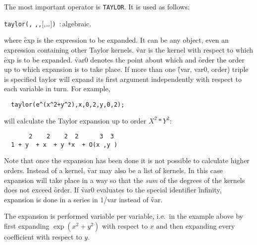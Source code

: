


The most important operator is \texttt{TAYLOR}.
It is used as follows:
\hypertarget{operator:TAYLOR}{}
\begin{syntax}
  \texttt{taylor(}\texttt{,}
         \texttt{,}\texttt{,}[,\ldots]\texttt{)}
         \,:\,algebraic.
\end{syntax}
where \f{exp} is the expression to be expanded. It can be any \REDUCE{}
object, even an expression containing other Taylor kernels. \f{var} is
the kernel with respect to which \f{exp} is to be expanded. \f{var0}
denotes the point about which and \f{order} the order up to which
expansion is to take place. If more than one \f{(var, var0, order)} triple
is specified \f{taylor} will expand its first argument independently
with respect to each variable in turn. For example,
\begin{verbatim}
  taylor(e^(x^2+y^2),x,0,2,y,0,2);
\end{verbatim}
will calculate the Taylor expansion up to order $X^{2}*Y^{2}$:
\begin{verbatim}
       2    2    2  2      3  3
  1 + y  + x  + y *x  + O(x ,y )
\end{verbatim}
Note that once the expansion has been done it is not possible to
calculate higher orders.
Instead of a kernel, \f{var} may also
be a list of kernels. In this case expansion will take place in a way
so that the \emph{sum} of the degrees of the kernels does not exceed
\f{order}.
If \f{var0} evaluates to the special identifier \f{infinity}, expansion is
done in a series in 1/var instead of \f{var}.

The expansion is performed variable per variable, i.e.\ in the example
above by first expanding $\exp(x^{2}+y^{2})$ with respect to $x$ and
then expanding every coefficient with respect to $y$.

